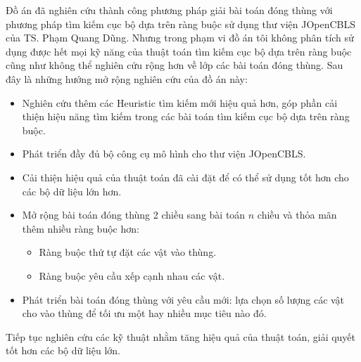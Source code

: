 Đồ án đã nghiên cứu thành công phương pháp giải bài toán đóng thùng với phương pháp tìm kiếm cục bộ dựa trên ràng buộc sử dụng thư viện JOpenCBLS của TS. Phạm Quang Dũng. Nhưng trong phạm vi đồ án tôi không phân tích sử dụng được hết mọi kỹ năng của thuật toán tìm kiếm cục bộ dựa trên ràng buộc cũng như không thể nghiên cứu rộng hơn về lớp các bài toán đóng thùng. Sau đây là những hướng mở rộng nghiên cứu của đồ án này:
\begin{itemize}
	\item Nghiên cứu thêm các Heuristic tìm kiếm mới hiệu quả hơn, góp phần cải thiện hiệu năng tìm kiếm trong các bài toán tìm kiếm cục bộ dựa trên ràng buộc.
	\item Phát triển đầy đủ bộ công cụ mô hình cho thư viện JOpenCBLS.
	\item Cải thiện hiệu quả của thuật toán đã cài đặt để có thể sử dụng tốt hơn cho các bộ dữ liệu lớn hơn.
	\item Mở rộng bài toán đóng thùng 2 chiều sang bài toán $n$ chiều và thỏa mãn thêm nhiều ràng buộc hơn:
	\begin{itemize}
		\item Ràng buộc thứ tự đặt các vật vào thùng.
		\item Ràng buộc yêu cầu xếp cạnh nhau các vật.
	\end{itemize}
	\item Phát triển bài toán đóng thùng với yêu cầu mới: lựa chọn số lượng các vật cho vào thùng để tối ưu một hay nhiều mục tiêu nào đó.
\end{itemize}
Tiếp tục nghiên cứu các kỹ thuật nhằm tăng hiệu quả của thuật toán, giải quyết tốt hơn các bộ dữ liệu lớn.
